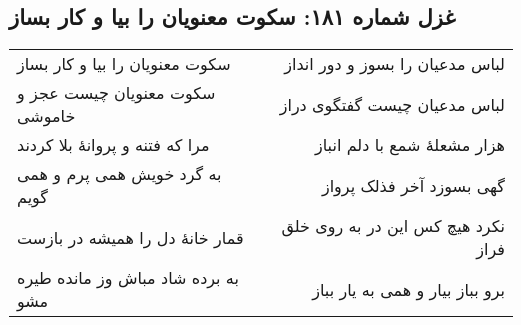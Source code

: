 \begin{center}
\section*{غزل شماره ۱۸۱: سکوت معنویان را بیا و کار بساز}
\label{sec:181}
\begin{longtable}{l p{0.5cm} r}
سکوت معنویان را بیا و کار بساز
&&
لباس مدعیان را بسوز و دور انداز
\\
سکوت معنویان چیست عجز و خاموشی
&&
لباس مدعیان چیست گفتگوی دراز
\\
مرا که فتنه و پروانهٔ بلا کردند
&&
هزار مشعلهٔ شمع با دلم انباز
\\
به گرد خویش همی پرم و همی گویم
&&
گهی بسوزد آخر فذلک پرواز
\\
قمار خانهٔ دل را همیشه در بازست
&&
نکرد هیچ کس این در به روی خلق فراز
\\
به برده شاد مباش وز مانده طیره مشو
&&
برو بباز بیار و همی به یار بباز
\\
\end{longtable}
\end{center}
